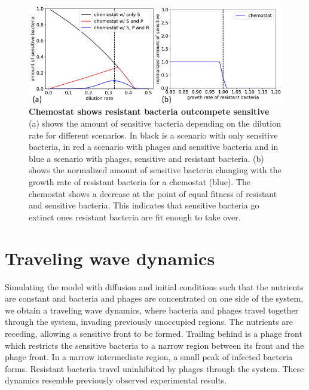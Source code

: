 \begin{figure}
\centering
\includegraphics[width=\linewidth]{graphics/2025_09_29_phages_fig2.png}
\caption{\textbf{Chemostat shows resistant bacteria outcompete sensitive} (a) shows the amount of sensitive bacteria depending on the dilution rate for different scenarios. In black is a scenario with only sensitive bacteria, in red a scenario with phages and sensitive bacteria and in blue a scenario with phages, sensitive and resistant bacteria. (b) shows the normalized amount of sensitive bacteria changing with the growth rate of resistant bacteria for a chemostat (blue). The chemostat shows a decrease at the point of equal fitness of resistant and sensitive bacteria. This indicates that sensitive bacteria go extinct ones resistant bacteria are fit enough to take over.}
\label{fig:results_chemostat_traveling_wave}
\end{figure}

\section{Traveling wave dynamics}
Simulating the model with diffusion and initial conditions such that the nutrients are constant and bacteria and phages are concentrated on one side of the system, we obtain a traveling wave dynamics, where bacteria and phages travel together through the system, invading previously unoccupied regions. The nutrients are receding, allowing a sensitive front to be formed. Trailing behind is a phage front which restricts the sensitive bacteria to a narrow region between its front and the phage front. In a narrow intermediate region, a small peak of infected bacteria forms. Resistant bacteria travel uninhibited by phages through the system. These dynamics resemble previously observed experimental results.


